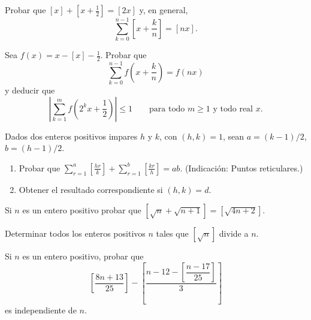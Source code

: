 \documentclass[12pt,a4paper]{book}
\begin{document}
    \begin{ejercicio}
        Probar que $[x]+[x+\tfrac{1}{2}]=[2x]$ y, en general,
        \begin{equation*}
            \sum_{k=0}^{n-1}\left[x+\frac{k}{n}\right]=[nx].
        \end{equation*}
    \end{ejercicio}

    \begin{ejercicio}
        Sea $f(x)=x-[x]-\tfrac{1}{2}$. Probar que
        \begin{equation*}
            \sum_{k=0}^{n-1}f\left(x+\frac{k}{n}\right)=f(nx)
        \end{equation*}
        y deducir que
        \begin{equation*}
            \left|\sum_{k=1}^{m}f\left(2^kx+\frac{1}{2}\right)\right|\leq1
            \qquad\text{para todo } m\geq1 \text{ y todo real } x.
        \end{equation*}
    \end{ejercicio}

    \begin{ejercicio}
        Dados dos enteros positivos impares $h$ y $k$, con $(h,k)=1$, sean $a=(k-1)/2$,
        $b=(h-1)/2$.
        \begin{enumerate}
            \item[(a)] Probar que
            $\displaystyle\sum_{r=1}^{a}\left[\frac{hr}{k}\right]
            +\sum_{r=1}^{b}\left[\frac{kr}{h}\right]=ab$. (Indicación: Puntos
            reticulares.)
            \item[(b)] Obtener el resultado correspondiente si $(h,k)=d$.
        \end{enumerate}
    \end{ejercicio}

    \begin{ejercicio}
        Si $n$ es un entero positivo probar que $[\sqrt n+\sqrt{n+1}]=[\sqrt{4n+2}]$.
    \end{ejercicio}

    \begin{ejercicio}
        Determinar todos los enteros positivos $n$ tales que $[\sqrt n]$ divide a $n$.
    \end{ejercicio}

    \begin{ejercicio}
        Si $n$ es un entero positivo, probar que
        \begin{equation*}
            \left[\frac{8n+13}{25}\right]-\left[\frac{n-12-\left[\dfrac{n-17}{25}\right]}{3}\right]
        \end{equation*}
        es independiente de $n$.
    \end{ejercicio}
\end{document}

